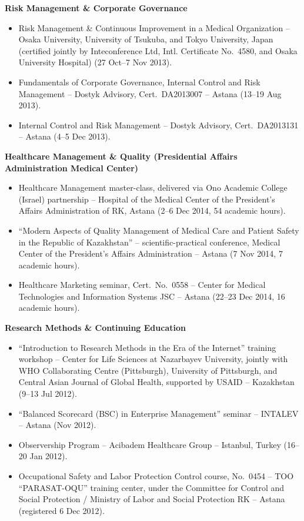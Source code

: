 \documentclass[11pt,a4paper,sans]{moderncv}
\begin{document}
\vspace{2pt}
\textbf{Risk Management \& Corporate Governance}
\begin{itemize}
\item{Risk Management \& Continuous Improvement in a Medical Organization -- Osaka University, University of Tsukuba, and Tokyo University, Japan (certified jointly by Inteconference Ltd, Intl. Certificate No.\ 4580, and Osaka University Hospital) (27 Oct--7 Nov 2013).}
\item{Fundamentals of Corporate Governance, Internal Control and Risk Management -- Dostyk Advisory, Cert.\ DA2013007 -- Astana (13--19 Aug 2013).}
\item{Internal Control and Risk Management -- Dostyk Advisory, Cert.\ DA2013131 -- Astana (4--5 Dec 2013).}
\end{itemize}

\vspace{2pt}
\textbf{Healthcare Management \& Quality (Presidential Affairs Administration Medical Center)}
\begin{itemize}
\item{Healthcare Management master-class, delivered via Ono Academic College (Israel) partnership -- Hospital of the Medical Center of the President's Affairs Administration of RK, Astana (2--6 Dec 2014, 54 academic hours).}
\item{``Modern Aspects of Quality Management of Medical Care and Patient Safety in the Republic of Kazakhstan'' -- scientific-practical conference, Medical Center of the President's Affairs Administration -- Astana (7 Nov 2014, 7 academic hours).}
\item{Healthcare Marketing seminar, Cert.\ No.\ 0558 -- Center for Medical Technologies and Information Systems JSC -- Astana (22--23 Dec 2014, 16 academic hours).}
\end{itemize}

\vspace{2pt}
\textbf{Research Methods \& Continuing Education}
\begin{itemize}
\item{``Introduction to Research Methods in the Era of the Internet'' training workshop -- Center for Life Sciences at Nazarbayev University, jointly with WHO Collaborating Centre (Pittsburgh), University of Pittsburgh, and Central Asian Journal of Global Health, supported by USAID -- Kazakhstan (9--13 Jul 2012).}
\item{``Balanced Scorecard (BSC) in Enterprise Management'' seminar -- INTALEV -- Astana (Nov 2012).}
\item{Observership Program -- Acibadem Healthcare Group -- Istanbul, Turkey (16--20 Jan 2012).}
\item{Occupational Safety and Labor Protection Control course, No.\ 0454 -- TOO ``PARASAT-OQU'' training center, under the Committee for Control and Social Protection / Ministry of Labor and Social Protection RK -- Astana (registered 6 Dec 2012).}
\end{itemize}
\end{document}
